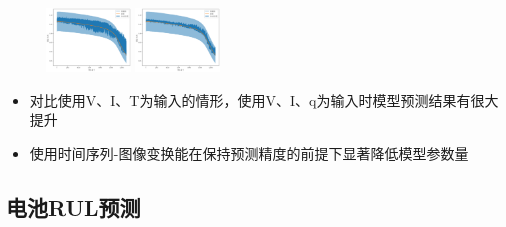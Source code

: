 \documentclass{beamer}
\begin{document}
\begin{frame}
\begin{figure}[htbp]
			{\label{fig:subfig3}\includegraphics[width=0.2\textwidth]{figures/soh_vitq/tri_group1_cell4_cnn_vit_trans.jpg}}
			{\label{fig:subfig4}\includegraphics[width=0.2\textwidth]{figures/soh_vitq/tri_group1_cell4_cnn_viq_trans.jpg}}
	\end{figure}
\end{frame}

\begin{frame}
\begin{table}[]
	\centering
	\caption{四组实验CNN模型预测性能评估结果}
	\end{table}
	\begin{itemize}
		\item 对比使用V、I、T为输入的情形，使用V、I、q为输入时模型预测结果有很大提升
		\item 使用时间序列-图像变换能在保持预测精度的前提下显著降低模型参数量
	\end{itemize}
\end{frame}

\subsection{电池RUL预测}
\end{document}
